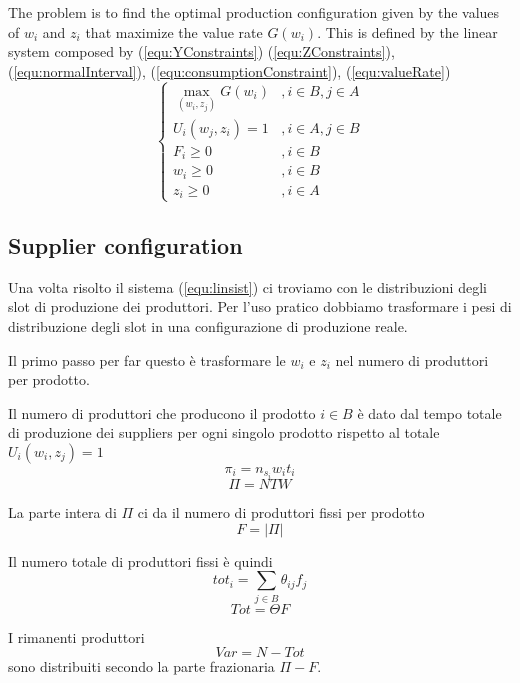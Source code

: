 \documentclass[a4paper,11pt]{article}
\begin{document}
The problem is to find the optimal production configuration given by the
values of $ w_i $ and $ z_i $ that maximize the value rate $ G(w_i) $.
This is defined by the linear system composed by
(\ref{equ:YConstraints})
(\ref{equ:ZConstraints}),
(\ref{equ:normalInterval}),
(\ref{equ:consumptionConstraint}),
(\ref{equ:valueRate})
\begin{equation}
\label{equ:linsist}
\left\{
\begin{array}{ll}
\max_{(w_i, z_j)} G(w_i) & , i \in B, j \in A \\
U_i(w_j, z_i) = 1 &  , i \in A, j \in B \\
F_i \ge 0 & , i \in B \\
w_i \ge 0 & , i \in B \\
z_i \ge 0 & , i \in A
\end{array}
\right.
\end{equation}


\subsection{Supplier configuration}

Una volta risolto il sistema (\ref{equ:linsist}) ci troviamo con le distribuzioni degli slot di produzione dei produttori.
Per l'uso pratico dobbiamo trasformare i pesi di distribuzione degli slot
in una configurazione di produzione reale.

Il primo passo per far questo è trasformare le $ w_i $ e $ z_i $ nel numero di produttori per prodotto.

Il numero di produttori che producono il prodotto $ i \in B $ è dato dal tempo totale di produzione dei suppliers per ogni singolo prodotto rispetto al totale $ U_i(w_i, z_j) = 1 $ 
\[
	\pi_i = n_{s_i} w_i t_i
\]
\[
  \Pi = N T W
\]

La parte intera di $ \Pi $ ci da il numero di produttori fissi per
prodotto
\[
	F = |\Pi|
\]

Il numero totale di produttori fissi è quindi
\[
	tot_i = \sum_{j \in B}  \theta_{ij} f_j
\]
\[
	Tot = \Theta F
\]

I rimanenti produttori
\[
	Var = N - Tot
\]
sono distribuiti secondo la parte frazionaria $ \Pi - F $.
\end{document}
